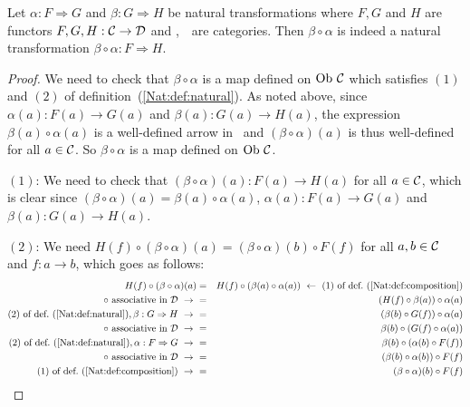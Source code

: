 \begin{prop}\label{Nat:prop:composition}
    Let $\alpha:F\Rightarrow G$ and $\beta:G\Rightarrow H$ be natural
    transformations where $F,G$ and $H$ are functors $F,G,H:\mbox{$\cal C$}\to\mbox{$\cal D$}$
    and \Cat,\ \Dat\ are categories. Then $\beta\circ\alpha$ is indeed
    a natural transformation $\beta\circ\alpha:F\Rightarrow H$.
\end{prop}
\begin{proof}
    We need to check that $\beta\circ\alpha$ is a map defined on
    $\mbox{\rm Ob}\ \mbox{$\cal C$}$ which satisfies $(1)$ and $(2)$ of 
    definition~(\ref{Nat:def:natural}). As noted above, since
    $\alpha(a):F(a)\to G(a)$ and $\beta(a):G(a)\to H(a)$, the expression
    $\beta(a)\circ\alpha(a)$ is a well-defined arrow in \Dat\ and 
    $(\beta\circ\alpha)(a)$ is thus well-defined for all
    $a\in\mbox{$\cal C$}$. So $\beta\circ\alpha$ is a map defined on $\mbox{\rm Ob}\ \mbox{$\cal C$}$.
    
    $(1)$: We need to check that $(\beta \circ \alpha)(a) : F(a) \to H(a)$
    for all $a\in\mbox{$\cal C$}$, which is clear since $(\beta\circ\alpha)(a)=
    \beta(a)\circ\alpha(a)$, $\alpha(a):F(a)\to G(a)$ and 
    $\beta(a):G(a)\to H(a)$.

    $(2)$: We need $H(f)\circ(\beta\circ\alpha)(a)=
    (\beta\circ\alpha)(b)\circ F(f)$ for all $a,b\in\mbox{$\cal C$}$ and $f:a\to b$,
    which goes as follows:
        \begin{eqnarray*}H(f)\circ(\beta\circ\alpha)(a)
            &=&H(f)\circ(\beta(a)\circ\alpha(a))
            \ \leftarrow\ \mbox{$(1)$ of def.~(\ref{Nat:def:composition})}\\
            \mbox{$\circ$ associative in \Dat}\ \to\ 
            &=&(H(f)\circ\beta(a))\circ\alpha(a)\\
            \mbox{$(2)$ of def.~(\ref{Nat:def:natural})}, \beta:G\Rightarrow H
            \ \to\
            &=&(\beta(b)\circ G(f))\circ\alpha(a)\\
            \mbox{$\circ$ associative in \Dat}\ \to\ 
            &=&\beta(b)\circ (G(f)\circ\alpha(a))\\
            \mbox{$(2)$ of def.~(\ref{Nat:def:natural})}, \alpha:F\Rightarrow G
            \ \to\
            &=&\beta(b)\circ (\alpha(b)\circ F(f))\\
            \mbox{$\circ$ associative in \Dat}\ \to\ 
            &=&(\beta(b)\circ\alpha(b))\circ F(f)\\
            \mbox{$(1)$ of def.~(\ref{Nat:def:composition})}\ \to\ 
            &=&(\beta\circ\alpha)(b)\circ F(f)\\
        \end{eqnarray*}
\end{proof}



